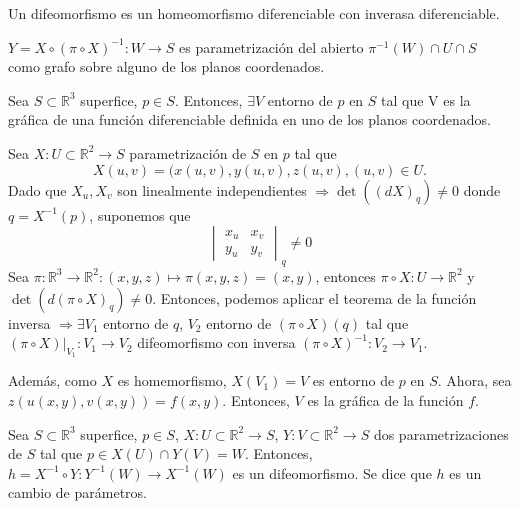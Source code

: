 \begin{obs}
  Un difeomorfismo es un homeomorfismo diferenciable con inverasa diferenciable.
\end{obs}

\begin{obs}
  $Y = X \circ ( \pi \circ X)^{-1} : W \to S$ es parametrización del abierto $\pi^{-1}(W)\cap U \cap S$ como grafo sobre alguno de los planos coordenados.
\end{obs}

\begin{prop}
  Sea $S \subset \mathbb{R}^{3}$ superfice, $p \in S$. Entonces, $\exists V$ entorno de $p$ en $S$ tal que V es la gráfica de una función diferenciable definida en uno de los planos coordenados.
\end{prop}

\begin{dem}
  Sea $X : U \subset \mathbb{R}^{2} \to S$ parametrización de $S$ en $p$ tal que
  \[
    X(u, v) = (x(u, v), y(u, v), z(u, v), (u, v) \in U.
  \]
  Dado que $X_{u}, X_{v}$ son linealmente independientes $ \Rightarrow \det((d X)_{q}) \neq 0$ donde $ q = X^{-1}(p)$, suponemos que
  \[ 
    \begin{vmatrix}
     x_{u} & x_{v} \\
     y_{u} & y_{v}
    \end{vmatrix}
    _{q}
    \neq 0
  \]
  Sea $\pi : \mathbb{R}^{3} \to \mathbb{R}^{2} : (x,y,z) \mapsto \pi(x,y,z) = (x,y)$, entonces $\pi \circ X : U \to \mathbb{R}^{2}$ y $\det(d (\pi \circ X)_{q}) \neq 0$. Entonces, podemos aplicar el teorema de la función inversa $\Rightarrow \exists V_{1}$ entorno de $q$, $V_{2}$ entorno de $(\pi \circ X)(q)$ tal que $(\pi \circ X)|_{V_{1}} : V_{1} \to V_{2}$ difeomorfismo con inversa $(\pi \circ X)^{-1} : V_{2} \to V_{1}$.

  Además, como $X$ es homemorfismo, $X(V_{1}) = V$ es entorno de $p$ en $S$. Ahora, sea $z(u(x,y),v(x,y)) = f(x,y)$. Entonces, $V$ es la gráfica de la función $f$.
\end{dem}

\begin{prop}
  Sea $S \subset \mathbb{R}^{3}$ superfice, $p \in S$, $X: U \subset \mathbb{R}^{2} \to S$, $Y: V \subset \mathbb{R}^{2} \to S$ dos parametrizaciones de $S$ tal que $p \in X(U) \cap Y(V) = W$. Entonces, $h = X^{-1} \circ Y: Y^{-1}(W) \to X^{-1}(W)$ es un difeomorfismo. Se dice que $h$ es un cambio de parámetros.
\end{prop}

